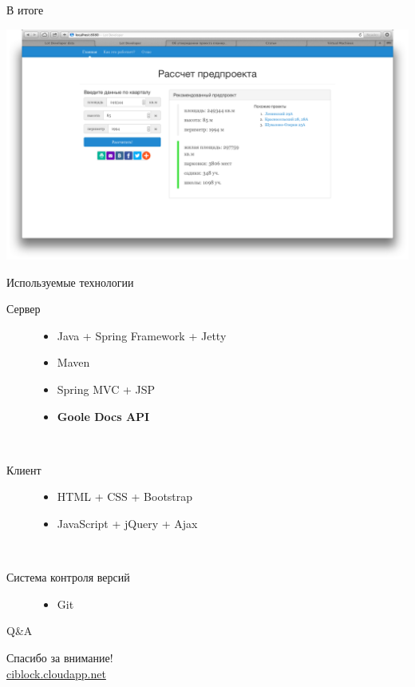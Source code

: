 \documentclass[14pt, fleqn, xcolor={dvipsnames, table}]{beamer}
\begin{document}
        \begin{frame}{В итоге}
            \begin{center}
                \includegraphics[scale=0.23]{example.png}
            \end{center}
        \end{frame}
        
        \begin{frame}{Используемые технологии}
            \begin{description}
                \item [Сервер]
                    \begin{itemize}
                        \item Java + Spring Framework + Jetty
                        \item Maven
                        \item Spring MVC + JSP
                        \item \bf{Goole Docs API}
                    \end{itemize}
                ~\\
                \item [Клиент]
                    \begin{itemize}
                        \item HTML + CSS + Bootstrap
                        \item JavaScript + jQuery + Ajax
                    \end{itemize}
                ~\\
                \item [Система контроля версий]
                    \begin{itemize}
                        \item Git
                    \end{itemize}
            \end{description}
        \end{frame}
        
        \begin{frame}{Q\&A}
            \begin{center}
                Спасибо за внимание!\\
                \href{http://ciblock.cloudapp.net}{ciblock.cloudapp.net}
            \end{center}
        \end{frame}
\end{document}

